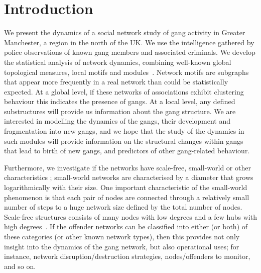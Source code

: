 \documentclass[conference]{IEEEtran}
\theoremstyle{definition}
\begin{document}
%
\IEEEpeerreviewmaketitle


\section{Introduction}\label{sec:introduction}

We present the dynamics of a social network study of gang activity in
Greater Manchester, a region in the north of the UK. We use the
intelligence gathered by police observations of known gang members and
associated criminals. We develop the statistical analysis of network
dynamics, combining well-known global topological measures, local
motifs and
modules~\cite{CostaRodriguesTraviesoVillasBoas2007,Jackson2008,Newman2003}.
Network motifs are subgraphs that appear more frequently in a real
network than could be statistically expected. At a global level, if
these networks of associations exhibit clustering behaviour this
indicates the presence of gangs. At a local level, any defined
substructures will provide us information about the gang structure. We
are interested in modelling the dynamics of the gangs, their
development and fragmentation into new gangs, and we hope that the
study of the dynamics in such modules will provide information on the
structural changes within gangs that lead to birth of new gangs, and
predictors of other gang-related behaviour.

Furthermore, we investigate if the networks have scale-free,
small-world or other characteristics
\cite{Watts1999,AlbertBarabasi2002,Newman2003}; small-world networks
are characterised by a diameter that grows logarithmically with their
size. One important characteristic of the small-world phenomenon is
that each pair of nodes are connected through a relatively small
number of steps to a huge network size defined by the total number of
nodes. Scale-free structures consists of many nodes with low degrees
and a few hubs with high
degrees~\cite{AlbAlbNak04,CostaRodriguesTraviesoVillasBoas2007,Jackson2008}. If
the offender networks can be classified into either (or both) of these
categories (or other known network types), then this provides not only
insight into the dynamics of the gang network, but also operational
uses; for instance, network disruption/destruction strategies,
nodes/offenders to monitor, and so on.
\end{document}

